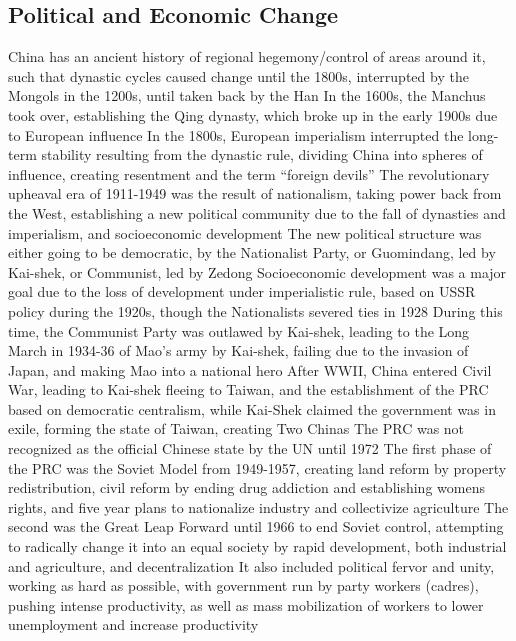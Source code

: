 \documentclass[11 pt, twoside]{article}
\newenvironment{outline*}
{
	\begin{outline}[enumerate]
	}
	{\end{outline}
}
\begin{document}
\begin{outlne*}
\subsection{Political and Economic Change}
\begin{outline*}
\1 China has an ancient history of regional hegemony/control of areas around it, such that dynastic cycles caused change until the 1800s, interrupted by the Mongols in the 1200s, until taken back by the Han
\2 In the 1600s, the Manchus took over, establishing the Qing dynasty, which broke up in the early 1900s due to European influence
\1 In the 1800s, European imperialism interrupted the long-term stability resulting from the dynastic rule, dividing China into spheres of influence, creating resentment and the term ``foreign devils''
\1 The revolutionary upheaval era of 1911-1949 was the result of nationalism, taking power back from the West, establishing a new political community due to the fall of dynasties and imperialism, and socioeconomic development
\2 The new political structure was either going to be democratic, by the Nationalist Party, or Guomindang, led by Kai-shek, or Communist, led by Zedong
\2 Socioeconomic development was a major goal due to the loss of development under imperialistic rule, based on USSR policy during the 1920s, though the Nationalists severed ties in 1928
\2 During this time, the Communist Party was outlawed by Kai-shek, leading to the Long March in 1934-36 of Mao's army by Kai-shek, failing due to the invasion of Japan, and making Mao into a national hero
\1 After WWII, China entered Civil War, leading to Kai-shek fleeing to Taiwan, and the establishment of the PRC based on democratic centralism, while Kai-Shek claimed the government was in exile, forming the state of Taiwan, creating Two Chinas
\2 The PRC was not recognized as the official Chinese state by the UN until 1972
\2 The first phase of the PRC was the Soviet Model from 1949-1957, creating land reform by property redistribution, civil reform by ending drug addiction and establishing womens rights, and five year plans to nationalize industry and collectivize agriculture
\2 The second was the Great Leap Forward until 1966 to end Soviet control, attempting to radically change it into an equal society by rapid development, both industrial and agriculture, and decentralization
\3 It also included political fervor and unity, working as hard as possible, with government run by party workers (cadres), pushing intense productivity, as well as mass mobilization of workers to lower unemployment and increase productivity

\end{outline*}
\end{outlne*}
\end{document}
